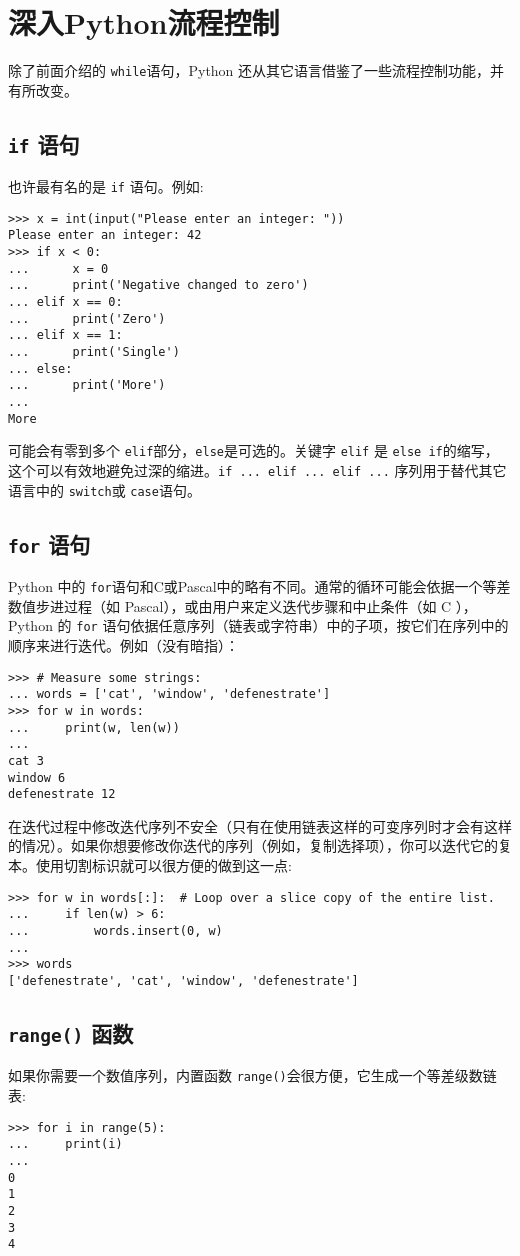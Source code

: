 \chapter{深入Python流程控制\label{ControlFlowTools}}
除了前面介绍的 \texttt{while}语句，Python 还从其它语言借鉴了一些流程控制功能，并有所改变。
\section{\texttt{if} 语句}
也许最有名的是 \texttt{if} 语句。例如:
\begin{lstlisting}
>>> x = int(input("Please enter an integer: "))
Please enter an integer: 42
>>> if x < 0:
...      x = 0
...      print('Negative changed to zero')
... elif x == 0:
...      print('Zero')
... elif x == 1:
...      print('Single')
... else:
...      print('More')
...
More
\end{lstlisting}
可能会有零到多个 \texttt{elif}部分，\texttt{else}是可选的。关键字 \texttt{elif} 是 \texttt{else if}的缩写，这个可以有效地避免过深的缩进。\texttt{if ... elif ... elif ...} 序列用于替代其它语言中的 \texttt{switch}或 \texttt{case}语句。
\section{\texttt{for} 语句}
Python 中的 \texttt{for}语句和C或Pascal中的略有不同。通常的循环可能会依据一个等差数值步进过程（如 Pascal），或由用户来定义迭代步骤和中止条件（如 C ），Python 的 \texttt{for} 语句依据任意序列（链表或字符串）中的子项，按它们在序列中的顺序来进行迭代。例如（没有暗指）：
\begin{lstlisting}
>>> # Measure some strings:
... words = ['cat', 'window', 'defenestrate']
>>> for w in words:
...     print(w, len(w))
...
cat 3
window 6
defenestrate 12
\end{lstlisting}
在迭代过程中修改迭代序列不安全（只有在使用链表这样的可变序列时才会有这样的情况）。如果你想要修改你迭代的序列（例如，复制选择项），你可以迭代它的复本。使用切割标识就可以很方便的做到这一点:
\begin{lstlisting}
>>> for w in words[:]:  # Loop over a slice copy of the entire list.
...     if len(w) > 6:
...         words.insert(0, w)
...
>>> words
['defenestrate', 'cat', 'window', 'defenestrate']
\end{lstlisting}
\section{\texttt{range()} 函数}
如果你需要一个数值序列，内置函数 \texttt{range()}会很方便，它生成一个等差级数链表:
\begin{lstlisting}
>>> for i in range(5):
...     print(i)
...
0
1
2
3
4
\end{lstlisting}

